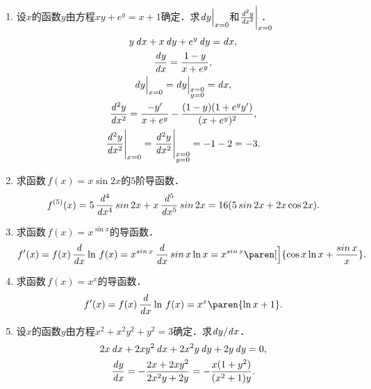 \begin{enumerate}
\item 设\(x\)的函数\(y\)由方程\(xy + e^y = x + 1\)确定．求\(\dy\Big\vert_{x=0}\)和\(\ddn[y]x2\bigg\vert_{x=0}\mkern-22mu\)．
  \ifshowsol
    \begingroup
    \addtolength{\jot}{1ex}
    \begin{gather*}
      y \dx + x \dy + e^y \dy = \dx, \\
      \dydx = \frac{1-y}{x+e^y}, \\
      \dy\Big\vert_{x=0} = \dy\Big\vert_{\substack{x=0 \\ y =0}} = \dx, \\
      \ddn[y]x2 = \frac{-y'}{x+e^y} - \frac{(1-y)(1+e^yy')}{(x+e^y)^2}, \\
      \ddn[y]x2\Bigg\vert_{x=0}
      = \ddn[y]x2\Bigg\vert_{\substack{x=0 \\ y =0}}
      = -1 - 2 = -3.
    \end{gather*}
    \endgroup
  \fi

\item 求函数\(\,f(x) = x \sin 2x\)的\(5\)阶导函数．
  \ifshowsol
    \begin{equation*}
      f^{(5)}(x)
      = 5 \,\ddn x4 \sin 2x + x \,\ddn x5 \sin 2x
      = 16 (5\sin 2x + 2x \cos 2x).
    \end{equation*}
  \fi

\item 求函数\(\,f(x) = x^{\sin x}\)的导函数．
  \ifshowsol
    \begin{equation*}
      f'(x)
      = f(x) \,\ddx \ln\,f(x)
      = x^{\sin x} \,\ddx \sin x \ln x
      = x^{\sin x} \paren[\Big]{\cos x \ln x + \frac{\sin x}{x}}.
    \end{equation*}
  \fi

\item 求函数\(\,f(x) = x^x\)的导函数．
  \ifshowsol
    \begin{equation*}
      f'(x)
      = f(x) \,\ddx \ln\,f(x)
      = x^x \paren{\ln x + 1}.
    \end{equation*}
  \fi

\item 设\(x\)的函数\(y\)由方程\(x^2 + x^2y^2 + y^2 = 3\)确定．求\(\dy/\!\dx\)．
  \ifshowsol
    \begin{gather*}
      2x \dx + 2xy^2 \dx + 2x^2y \dy + 2y \dy = 0, \\
      \dydx = - \frac{2x+2xy^2}{2x^2y+2y} = - \frac{x(1+y^2)}{(x^2+1)y}.
    \end{gather*}
  \fi
\end{enumerate}
\fi

